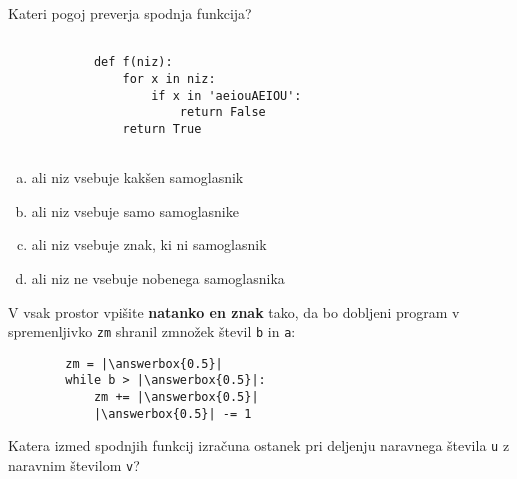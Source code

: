 \documentclass[arhiv, 10pt]{../izpit}
\newcommand{\inlinepy}[1]{\texttt{#1}}
\newcommand{\answerbox}[1]{\framebox{\vphantom{\large M}\hspace{#1cm}}}
\begin{document}
        \naloga*

        \begin{multicols}{2}
        \noindent
        Kateri pogoj preverja spodnja funkcija?
        \begin{verbatim}
        
            def f(niz):
                for x in niz:
                    if x in 'aeiouAEIOU':
                        return False
                return True
            
        \end{verbatim}

        \begin{enumerate}[(a)]
\item ali niz vsebuje kakšen samoglasnik
\item ali niz vsebuje samo samoglasnike
\item ali niz vsebuje znak, ki ni samoglasnik
\item ali niz ne vsebuje nobenega samoglasnika
\end{enumerate}

        \end{multicols}
    
        \naloga*
        \begin{multicols}{2}
        \noindent
        V vsak prostor vpišite \textbf{natanko en znak} tako, da bo dobljeni program v spremenljivko \inlinepy{zm} shranil zmnožek števil \inlinepy{b} in \inlinepy{a}:
        
        \columnbreak
        \begin{verbatim}
        zm = |\answerbox{0.5}|
        while b > |\answerbox{0.5}|:
            zm += |\answerbox{0.5}|
            |\answerbox{0.5}| -= 1
        \end{verbatim}
        \end{multicols}
    
        \clearpage
        \naloga
        
        Katera izmed spodnjih funkcij izračuna ostanek pri deljenju naravnega števila \inlinepy{u} z naravnim številom \inlinepy{v}?
    
\end{document}
